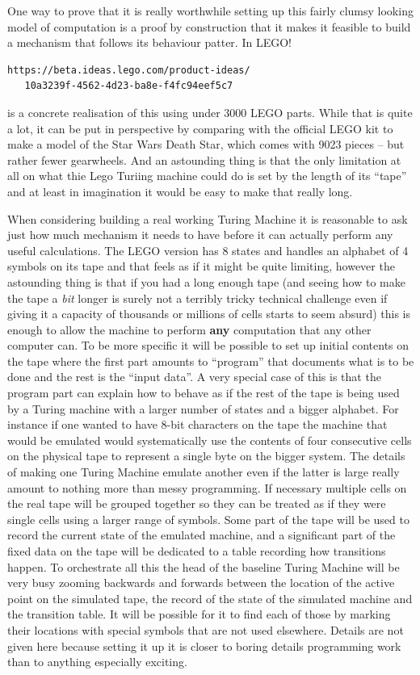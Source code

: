 One way to prove that it is really worthwhile setting up this fairly
clumsy looking model of computation is a proof by construction that it
makes it feasible to build a mechanism that follows its behaviour
patter. In LEGO!

\begin{verbatim}
https://beta.ideas.lego.com/product-ideas/
   10a3239f-4562-4d23-ba8e-f4fc94eef5c7
\end{verbatim}
is a concrete realisation of this using under 3000 LEGO parts. While that is
quite a lot, it can be put in perspective by comparing with the official
LEGO kit to make a model of the Star Wars Death Star, which comes with
9023 pieces -- but rather fewer gearwheels. And an astounding thing is that
the only limitation at all on what thie Lego Turiing machine could do is
set by the length of its ``tape'' and at least in imagination it would be
easy to make that really long.

When considering building a real working Turing Machine it is reasonable to
ask just how much mechanism it needs to have before it can actually
perform any useful calculations. The LEGO version has 8 states and
handles an alphabet of 4 symbols on its tape and that feels as if it might be
quite limiting, however the astounding thing is that if you had a long
enough tape (and seeing how to make the tape a {\em bit} longer is surely not
a terribly tricky technical challenge even if giving it a capacity of
thousands or millions of cells starts to seem absurd) this is enough to
allow the machine to perform {\bf any} computation that any other computer
can. To be more specific it will be possible to set up initial contents on the
tape where the first part amounts to ``program'' that documents what is
to be done and the rest is the ``input data''. A very special case of this
is that the program part can explain how to behave as if the rest of the
tape is being used by a Turing machine with a larger number of states
and a bigger alphabet. For instance if one wanted to have 8-bit
characters on the tape the machine that would be emulated would
systematically use the contents of four consecutive cells on the physical
tape to represent a single byte on the bigger system. The details of
making one Turing Machine emulate another even if the latter is
large really amount to nothing more than messy programming. If necessary
multiple cells on the real tape will be grouped together so they can be
treated as if they were single cells using a larger range of symbols. Some
part of the tape will be used to record the current state of the emulated
machine, and a significant part of the fixed data on the tape will be
dedicated to a table recording how transitions happen. To orchestrate
all this the head of the baseline Turing Machine will be very busy
zooming backwards and forwards between the location of the active point on
the simulated tape, the record of the state of the simulated machine and the
transition table. It will be possible for it to find each of those by
marking their locations with special symbols that are not used elsewhere.
Details are not given here because setting it up it is closer to boring
details programming work than to anything especially exciting.

